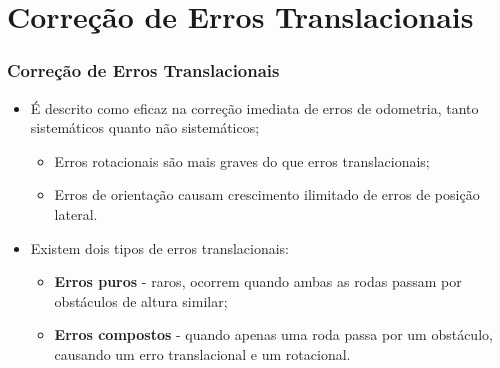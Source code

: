 \documentclass[xcolor=dvipsnames, aspectratio=169]{beamer}
\begin{document}
\section{Correção de Erros Translacionais}
\begin{frame}
  \frametitle{Correção de Erros Translacionais}
  \begin{itemize}
    \item É descrito como eficaz na correção imediata de erros de odometria, tanto sistemáticos quanto não sistemáticos;
    \begin{itemize}
      \item Erros rotacionais são mais graves do que erros translacionais;
      \item Erros de orientação causam crescimento ilimitado de erros de posição lateral.
    \end{itemize}
        
    \item Existem dois tipos de erros translacionais: 
    \begin{itemize}
      \item \textbf{Erros puros} - raros, ocorrem quando ambas as rodas passam por obstáculos de altura similar;
      \item \textbf{Erros compostos} - quando apenas uma roda passa por um obstáculo, causando um erro translacional e um rotacional.
    \end{itemize}
        

\end{itemize}
\end{frame}
\end{document}
